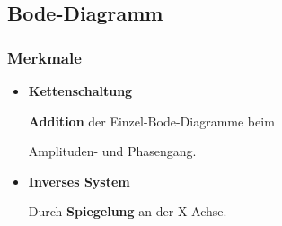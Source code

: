  \subsection{Bode-Diagramm}
 \subsubsection{Merkmale}
 \begin{itemize}
 	\item \textbf{Kettenschaltung}
 	
 	\textbf{Addition} der Einzel-Bode-Diagramme beim \par Amplituden- und Phasengang. 
 	
 	\item \textbf{Inverses System}
 	
 	Durch \textbf{Spiegelung} an der X-Achse. 
 \end{itemize}
 
